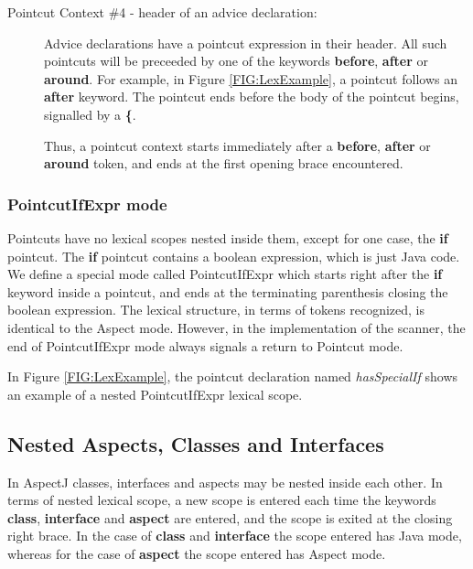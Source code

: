 \begin{description}
\item[Pointcut Context \#4 - header of an advice declaration:]

Advice declarations have a pointcut expression in their header.
All such pointcuts will be preceeded by one of the keywords
{\bf before}, {\bf after} or {\bf around}.    For example, in
Figure \ref{FIG:LexExample},  a pointcut follows an {\bf after} keyword.
The pointcut ends before the body of the pointcut begins, signalled by
a {\bf \{}.

Thus, a pointcut context starts immediately after a {\bf before},
{\bf after} or {\bf around} token, and ends at the first opening
brace encountered.

\end{description}

\subsubsection{{\sc PointcutIfExpr} mode} 

Pointcuts have no lexical scopes nested inside them, 
except for one case, the
{\bf if} pointcut.   The {\bf if} pointcut contains a boolean
expression, which is just Java code.
We define a special
mode called {\sc PointcutIfExpr} which starts right after the
{\bf if} keyword inside a pointcut, and ends at the terminating
parenthesis closing the boolean expression.   The lexical structure,
in terms of tokens recognized, is identical to the {\sc Aspect} mode.    
However, in the implementation of the scanner, the end of 
{\sc PointcutIfExpr} mode always signals a return to 
{\sc Pointcut} mode.

In Figure \ref{FIG:LexExample}, the pointcut declaration named
{\em hasSpecialIf} shows an example of a nested {\sc PointcutIfExpr}
lexical scope.

\subsection{Nested Aspects, Classes and Interfaces}

In AspectJ classes, interfaces and aspects may be nested inside each 
other.   In terms of nested lexical scope,  a new scope is entered 
each time the keywords {\bf class}, {\bf interface} and {\bf aspect}
are entered,  and the scope is exited at the closing right brace.
In the case of {\bf class} and {\bf interface} the scope entered
has {\sc Java} mode,  whereas for the case of {\bf aspect} the scope
entered has {\sc Aspect} mode.

